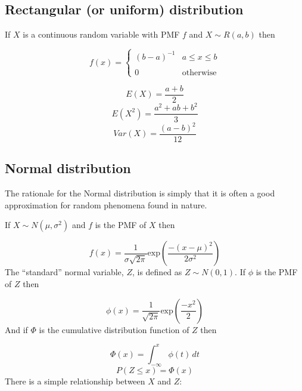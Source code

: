 \documentclass[a5paper]{article}
\begin{document}
\subsection{Rectangular (or uniform) distribution}

If $X$ is a continuous random variable with PMF $f$ and $X\sim R(a, b)$ then

\begin{equation}
  f(x) = \left\{
  \begin{array}{ll}
    (b-a)^{-1} & a\le x\le b\\\\
    0 & \mbox{otherwise}
  \end{array}
  \right.
\end{equation}

\begin{equation}
  E(X) = \frac{a+b}{2}
\end{equation}
\begin{equation}
  E(X^2) = \frac{a^2+ab+b^2}{3}
\end{equation}
\begin{equation}
  Var(X) = \frac{(a-b)^2}{12}
\end{equation}

\subsection{Normal distribution}

The rationale for the Normal distribution is simply that it is often a good
approximation for random phenomena found in nature.

If $X \sim N(\mu,\sigma^2)$ and $f$ is the PMF of $X$ then

\begin{equation}\label{eq:13}
  f(x) = \frac{1}{\sigma\sqrt{2\pi}}\mathrm{exp}\left(\frac{-(x-\mu)^2}{2\sigma^2}\right)
\end{equation}
The ``standard'' normal variable, $Z$, is defined as $Z\sim N(0,1)$. If $\phi$ is
the PMF of $Z$ then

\begin{equation}\label{eq:12}
  \phi(x) = \frac{1}{\sqrt{2\pi}}\mathrm{exp}\left(\frac{-x^2}{2}\right)
\end{equation}
And if $\Phi$ is the cumulative distribution function of $Z$ then

\begin{equation}
  \Phi(x) = \int_{-\infty}^{x}\phi(t)\,dt
\end{equation}
\begin{equation}
  P(Z\le x) = \Phi(x)
\end{equation}
There is a simple relationship between $X$ and $Z$:
\end{document}
